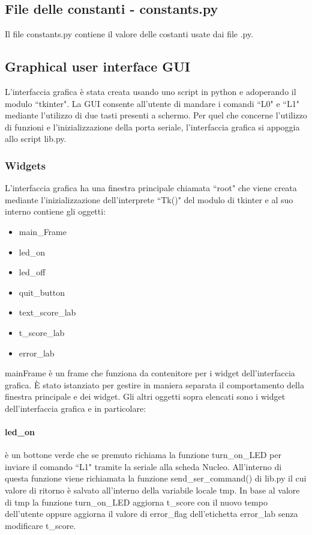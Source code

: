 \documentclass[a4paper]{article}
\begin{document}
\subsection{File delle constanti - constants.py}
Il file constants.py contiene il valore delle costanti usate dai file .py.
\subsection{Graphical user interface GUI}
L'interfaccia grafica è stata creata usando uno script in python e adoperando il modulo ``tkinter". La GUI consente all'utente di mandare i comandi ``L0" e ``L1" mediante l'utilizzo di due tasti presenti a schermo. Per quel che concerne l'utilizzo di funzioni e l'inizializzazione della porta seriale, l'interfaccia grafica si appoggia allo script lib.py.
\subsubsection{Widgets}
L'interfaccia grafica ha una finestra principale chiamata ``root" che viene creata mediante l'inizializzazione dell'interprete ``Tk()" del modulo di tkinter e al suo interno contiene gli oggetti:
\begin{itemize}
	\item main\_Frame
	\item led\_on
	\item led\_off
	\item quit\_button
	\item text\_score\_lab
	\item t\_score\_lab
	\item error\_lab
\end{itemize}
mainFrame è un frame che funziona da contenitore per i widget dell'interfaccia grafica. \`E stato istanziato per gestire in maniera separata il comportamento della finestra principale e dei widget.
Gli altri oggetti sopra elencati sono i widget dell'interfaccia grafica e in particolare:
\paragraph{led\_on} è un bottone verde che se premuto richiama la funzione turn\_on\_LED per inviare il comando ``L1" tramite la seriale alla scheda Nucleo. All'interno di questa funzione viene richiamata la funzione send\_ser\_command() di lib.py il cui valore di ritorno è salvato all'interno della variabile locale tmp. In base al valore di tmp la funzione turn\_on\_LED aggiorna t\_score con il nuovo tempo dell'utente oppure aggiorna il valore di error\_flag dell'etichetta error\_lab senza modificare t\_score.
\end{document}
